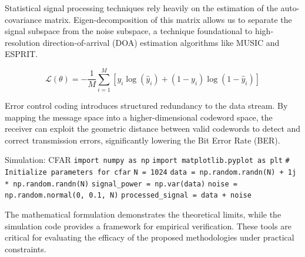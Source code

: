 Statistical signal processing techniques rely heavily on the estimation of the auto-covariance matrix. Eigen-decomposition of this matrix allows us to separate the signal subspace from the noise subspace, a technique foundational to high-resolution direction-of-arrival (DOA) estimation algorithms like MUSIC and ESPRIT.

\begin{equation}
    \mathcal{L}(\theta) = -\frac{1}{M} \sum_{i=1}^{M} \left[ y_i \log(\hat{y}_i) + (1-y_i)\log(1-\hat{y}_i) \right]
\end{equation}

Error control coding introduces structured redundancy to the data stream. By mapping the message space into a higher-dimensional codeword space, the receiver can exploit the geometric distance between valid codewords to detect and correct transmission errors, significantly lowering the Bit Error Rate (BER).

\begin{pythonbox}{Simulation: CFAR}
\texttt{import numpy as np}
\texttt{import matplotlib.pyplot as plt}
\texttt{}
\texttt{\# Initialize parameters for cfar}
\texttt{N = 1024}
\texttt{data = np.random.randn(N) + 1j * np.random.randn(N)}
\texttt{signal\_power = np.var(data)}
\texttt{noise = np.random.normal(0, 0.1, N)}
\texttt{processed\_signal = data + noise}
\end{pythonbox}

\vspace{0.5cm}
The mathematical formulation demonstrates the theoretical limits, while the simulation code provides a framework for empirical verification. These tools are critical for evaluating the efficacy of the proposed methodologies under practical constraints.

